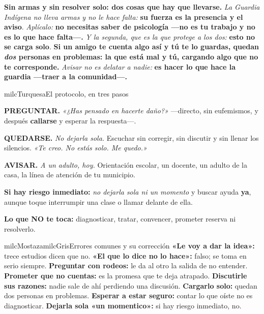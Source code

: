 \documentclass[11pt,letterpaper]{article}
\newcommand{\milcpaso}[3]{%
\Needspace{4\baselineskip}%
\begin{tcolorbox}[enhanced,colback=white,colframe=milcLinea,arc=1.5mm,boxrule=.9pt,
  left=14mm,right=4mm,top=3mm,bottom=3mm,before skip=4pt,after skip=4pt,
  fontupper=\RaggedRight,
  overlay={\node[anchor=north west,circle,fill=#2,text=white,inner sep=0pt,
    minimum size=7.4mm,font=\sffamily\bfseries\small]
    at ([xshift=3.6mm,yshift=-3.2mm]frame.north west) {#1};}]
#3
\end{tcolorbox}}
\begin{document}
\milcpaso{4}{milcTurquesa}{\textbf{Sin armas y sin resolver solo: dos cosas que hay que llevarse.} \emph{La Guardia Indígena no lleva armas y no le hace falta:} \textbf{su fuerza es la presencia y el aviso}. \emph{Aplícalo:} \textbf{no necesitas saber de psicología ---no es tu trabajo y no es lo que hace falta---.} \emph{Y la segunda, que es la que protege a los dos:} \textbf{esto no se carga solo}. \textbf{Si un amigo te cuenta algo así y tú te lo guardas, quedan \emph{dos} personas en problemas: la que está mal y tú, cargando algo que no te corresponde.} \emph{Avisar no es delatar a nadie:} \textbf{es hacer lo que hace la guardia ---traer a la comunidad---.}}

\begin{drawbox}{milcTurquesa}{El protocolo, en tres pasos}
\begin{pasoslista}
\item \textbf{PREGUNTAR.} \emph{«¿Has pensado en hacerte daño?»} ---directo, sin eufemismos, y después \textbf{callarse} y esperar la respuesta---.
\item \textbf{QUEDARSE.} \emph{No dejarla sola.} Escuchar sin corregir, sin discutir y sin llenar los silencios. \emph{«Te creo. No estás solo. Me quedo.»}
\item \textbf{AVISAR.} \emph{A un adulto, hoy.} Orientación escolar, un docente, un adulto de la casa, la línea de atención de tu municipio.
\item \textbf{Si hay riesgo inmediato:} \emph{no dejarla sola ni un momento} y buscar ayuda \textbf{ya}, aunque toque interrumpir una clase o llamar delante de ella.
\item \textbf{Lo que NO te toca:} diagnosticar, tratar, convencer, prometer reserva ni resolverlo.
\end{pasoslista}
\end{drawbox}

\begin{softbox}{milcMostaza}{milcGris}{Errores comunes y su corrección}
\textbf{«Le voy a dar la idea»:} trece estudios dicen que no. \textbf{«El que lo dice no lo hace»:} falso; se toma en serio siempre. \textbf{Preguntar con rodeos:} le da al otro la salida de no entender. \textbf{Prometer que no cuentas:} es la promesa que te deja atrapado. \textbf{Discutirle sus razones:} nadie sale de ahí perdiendo una discusión. \textbf{Cargarlo solo:} quedan dos personas en problemas. \textbf{Esperar a estar seguro:} contar lo que oíste no es diagnosticar. \textbf{Dejarla sola «un momentico»:} si hay riesgo inmediato, no.
\end{softbox}
\end{document}
